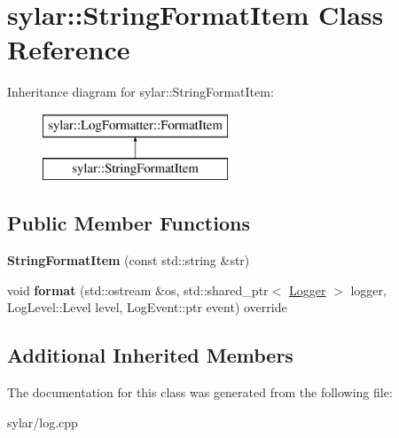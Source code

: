 \hypertarget{classsylar_1_1StringFormatItem}{\section{sylar\-:\-:String\-Format\-Item Class Reference}
\label{classsylar_1_1StringFormatItem}
}
Inheritance diagram for sylar\-:\-:String\-Format\-Item\-:\begin{figure}[H]
\begin{center}
\leavevmode
\includegraphics[height=2.000000cm]{classsylar_1_1StringFormatItem}
\end{center}
\end{figure}
\subsection*{Public Member Functions}
\begin{DoxyCompactItemize}
\item 
\hypertarget{classsylar_1_1StringFormatItem_a013acd8fa40a4b343d5024aa1bc097a5}{{\bfseries String\-Format\-Item} (const std\-::string \&str)}\label{classsylar_1_1StringFormatItem_a013acd8fa40a4b343d5024aa1bc097a5}

\item 
\hypertarget{classsylar_1_1StringFormatItem_a2fec3462d4ea31899f0cf050910915a6}{void {\bfseries format} (std\-::ostream \&os, std\-::shared\-\_\-ptr$<$ \hyperlink{classsylar_1_1Logger}{Logger} $>$ logger, Log\-Level\-::\-Level level, Log\-Event\-::ptr event) override}\label{classsylar_1_1StringFormatItem_a2fec3462d4ea31899f0cf050910915a6}

\end{DoxyCompactItemize}
\subsection*{Additional Inherited Members}


The documentation for this class was generated from the following file\-:\begin{DoxyCompactItemize}
\item 
sylar/log.\-cpp\end{DoxyCompactItemize}
